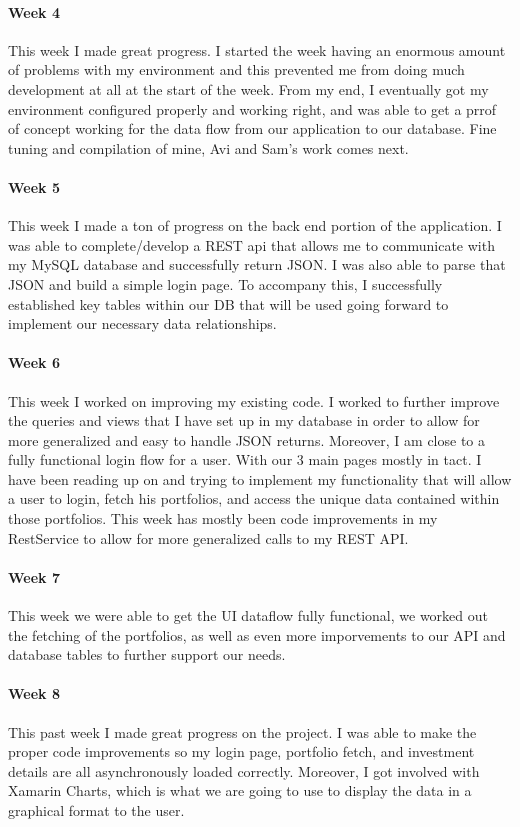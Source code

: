 \documentclass{article}
\begin{document}
\paragraph{Week 4}
This week I made great progress. I started the week having an enormous amount of problems with my environment and this prevented me from doing much development at all at the start of the week. From my end, I eventually got my environment configured properly and working right, and was able to get a prrof of concept working for the data flow from our application to our database. Fine tuning and compilation of mine, Avi and Sam's work comes next.
\paragraph{Week 5}
This week I made a ton of progress on the back end portion of the application. I was able to complete/develop a REST api that allows me to communicate with my MySQL database and successfully return JSON. I was also able to parse that JSON and build a simple login page. To accompany this, I successfully established key tables within our DB that will be used going forward to implement our necessary data relationships.
\paragraph{Week 6}
This week I worked on improving my existing code. I worked to further improve the queries and views that I have set up in my database in order to allow for more generalized and easy to handle JSON returns. 
Moreover, I am close to a fully functional login flow for a user. With our 3 main pages mostly in tact. I have been reading up on and trying to implement my functionality that will allow a user to login, fetch his portfolios, and access the unique data contained within those portfolios. This week has mostly been code improvements in my RestService to allow for more generalized calls to my REST API.
\paragraph{Week 7}
This week we were able to get the UI dataflow fully functional, we worked out the fetching of the portfolios, as well as even more imporvements to our API and database tables to further support our needs. 
\paragraph{Week 8}
This past week I made great progress on the project. I was able to make the proper code improvements so my login page, portfolio fetch, and investment details are all asynchronously loaded correctly. Moreover, I got involved with Xamarin Charts, which is what we are going to use to display the data in a graphical format to the user. 
 
\end{document}
